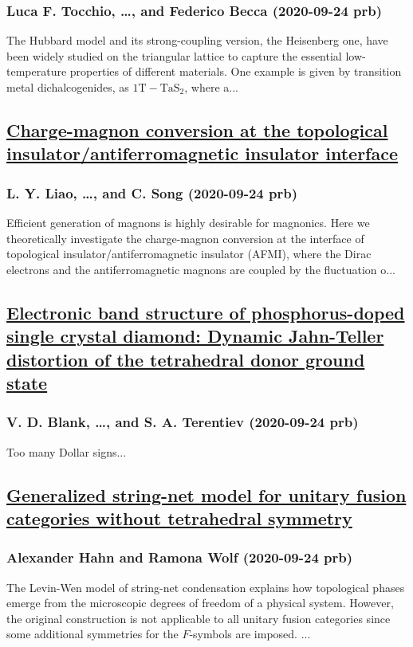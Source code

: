 \subsubsection*{Luca F. Tocchio, \dots, and Federico Becca (2020-09-24 prb)}
The Hubbard model and its strong-coupling version, the Heisenberg one, have been widely studied on the triangular lattice to capture the essential low-temperature properties of different materials. One example is given by transition metal dichalcogenides, as $1\mathrm{T}−{\mathrm{TaS}}_{2}$, where a...
\subsection*{\href{http://link.aps.org/doi/10.1103/PhysRevB.102.115152}{Charge-magnon conversion at the topological insulator/antiferromagnetic insulator interface}}
\subsubsection*{L. Y. Liao, \dots, and C. Song (2020-09-24 prb)}
Efficient generation of magnons is highly desirable for magnonics. Here we theoretically investigate the charge-magnon conversion at the interface of topological insulator/antiferromagnetic insulator (AFMI), where the Dirac electrons and the antiferromagnetic magnons are coupled by the fluctuation o...
\subsection*{\href{http://link.aps.org/doi/10.1103/PhysRevB.102.115153}{Electronic band structure of phosphorus-doped single crystal diamond: Dynamic Jahn-Teller distortion of the tetrahedral donor ground state}}
\subsubsection*{V. D. Blank, \dots, and S. A. Terentiev (2020-09-24 prb)}
Too many Dollar signs...
\subsection*{\href{http://link.aps.org/doi/10.1103/PhysRevB.102.115154}{Generalized string-net model for unitary fusion categories without tetrahedral symmetry}}
\subsubsection*{Alexander Hahn and Ramona Wolf (2020-09-24 prb)}
The Levin-Wen model of string-net condensation explains how topological phases emerge from the microscopic degrees of freedom of a physical system. However, the original construction is not applicable to all unitary fusion categories since some additional symmetries for the $F$-symbols are imposed. ...

